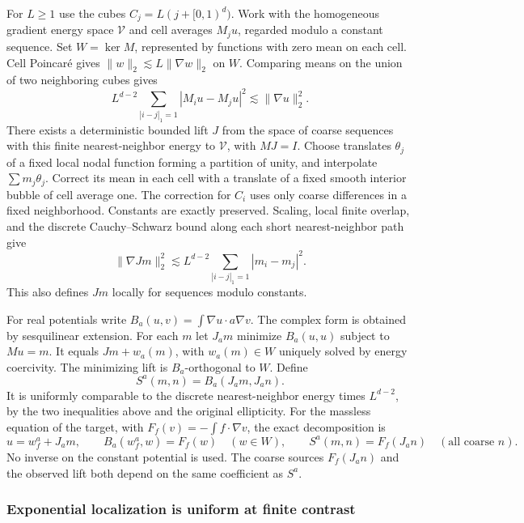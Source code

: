 \documentclass[11pt]{article}
\begin{document}
For \(L\ge1\) use the cubes \(C_j=L(j+[0,1)^d)\). Work with the homogeneous gradient energy space \(\mathscr V\) and cell averages \(M_j u\), regarded modulo a constant sequence. Set \(W=\ker M\), represented by functions with zero mean on each cell. Cell Poincaré gives \(\|w\|_2\lesssim L\|\nabla w\|_2\) on \(W\). Comparing means on the union of two neighboring cubes gives \[
L^{d-2}\sum_{|i-j|_1=1}|M_i u-M_j u|^2\lesssim\|\nabla u\|_2^2 .
\] There exists a deterministic bounded lift \(J\) from the space of coarse sequences with this finite nearest-neighbor energy to \(\mathscr V\), with \(M J=I\). Choose translates \(\theta_j\) of a fixed local nodal function forming a partition of unity, and interpolate \(\sum m_j\theta_j\). Correct its mean in each cell with a translate of a fixed smooth interior bubble of cell average one. The correction for \(C_i\) uses only coarse differences in a fixed neighborhood. Constants are exactly preserved. Scaling, local finite overlap, and the discrete Cauchy--Schwarz bound along each short nearest-neighbor path give \[
\|\nabla Jm\|_2^2\lesssim L^{d-2}\sum_{|i-j|_1=1}|m_i-m_j|^2.
\] This also defines \(Jm\) locally for sequences modulo constants.

For real potentials write \(B_a(u,v)=\int\nabla u\cdot a\nabla v\). The complex form is obtained by sesquilinear extension. For each \(m\) let \(J_a m\) minimize \(B_a(u,u)\) subject to \(M u=m\). It equals \(Jm+w_a(m)\), with \(w_a(m)\in W\) uniquely solved by energy coercivity. The minimizing lift is \(B_a\)-orthogonal to \(W\). Define \[
S^a(m,n)=B_a(J_a m,J_a n).
\] It is uniformly comparable to the discrete nearest-neighbor energy times \(L^{d-2}\), by the two inequalities above and the original ellipticity. For the massless equation of the target, with \(F_f(v)=-\int f\cdot\nabla v\), the exact decomposition is \[
u=w_f^a+J_a m,\qquad
B_a(w_f^a,w)=F_f(w)\quad(w\in W),\qquad
S^a(m,n)=F_f(J_a n)\quad(\text{all coarse }n).
\] No inverse on the constant potential is used. The coarse sources \(F_f(J_a n)\) and the observed lift both depend on the same coefficient as \(S^a\).

\subsubsection{Exponential localization is uniform at finite contrast}\label{exponential-localization-is-uniform-at-finite-contrast}
\end{document}
